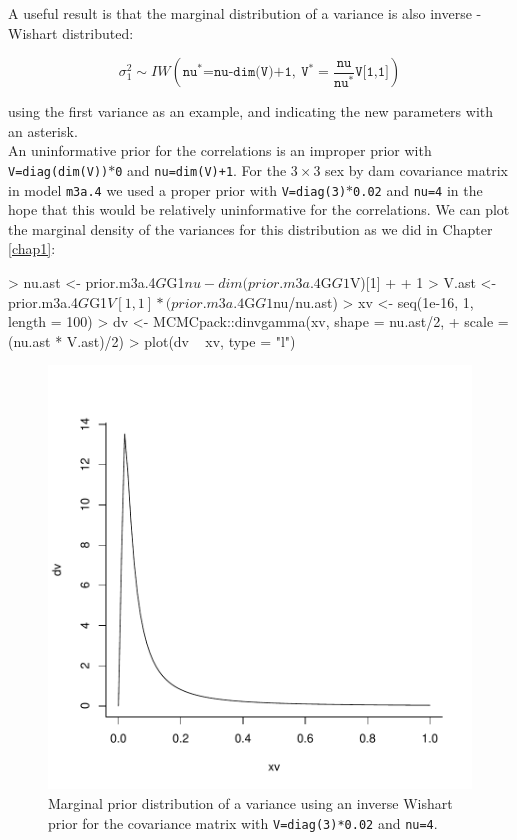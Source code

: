 \documentclass{article}
\begin{document}
A useful result is that the marginal distribution of a variance is also inverse - Wishart distributed:

\begin{displaymath}
\sigma^{2}_{1} \sim IW\left(\texttt{nu}^{\ast}\texttt{=nu-dim(V)+1},\ \texttt{V}^{\ast}=\frac{\texttt{nu}}{\texttt{nu}^{\ast}}\texttt{V[1,1]}\right)
\end{displaymath}

using the first variance as an example, and indicating the new parameters with an asterisk.\\

An uninformative prior for the correlations is an improper prior with \texttt{V=diag(dim(V))$\ast$0} and \texttt{nu=dim(V)+1}. For the $3\times3$ sex by dam covariance matrix in model \texttt{m3a.4} we used a proper prior with \texttt{V=diag(3)$\ast$0.02} and \texttt{nu=4} in the hope that this would be relatively uninformative for the correlations. We can plot the marginal density of the variances for this distribution as we did in Chapter \ref{chap1}:

\begin{Schunk}
\begin{Sinput}
> nu.ast <- prior.m3a.4$G$G1$nu - dim(prior.m3a.4$G$G1$V)[1] + 
+     1
> V.ast <- prior.m3a.4$G$G1$V[1, 1] * (prior.m3a.4$G$G1$nu/nu.ast)
> xv <- seq(1e-16, 1, length = 100)
> dv <- MCMCpack::dinvgamma(xv, shape = nu.ast/2, 
+     scale = (nu.ast * V.ast)/2)
> plot(dv ~ xv, type = "l")
\end{Sinput}
\end{Schunk}

\begin{figure}[!h]
\begin{center}
\includegraphics{Lecture3-028}
\end{center}
\caption{Marginal prior distribution of a variance using an inverse Wishart prior for the covariance matrix with \texttt{V=diag(3)*0.02} and \texttt{nu=4}.}
\label{NIc-fig}
\end{figure}
\end{document}
